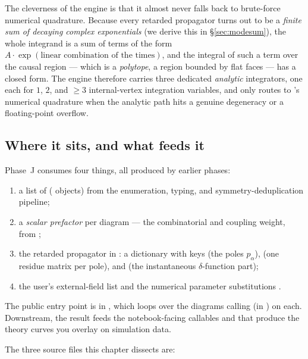 The cleverness of the engine is that it almost never falls back to brute-force
numerical quadrature. Because every retarded propagator turns out to be a
\emph{finite sum of decaying complex exponentials} (we derive this in
\S\ref{sec:modesum}), the whole integrand is a sum of terms of the form
$A \cdot \exp(\text{linear combination of the times})$, and the integral of such
a term over the causal region --- which is a \emph{polytope}, a region bounded by
flat faces --- has a closed form. The engine therefore carries three dedicated
\emph{analytic} integrators, one each for $1$, $2$, and $\ge 3$ internal-vertex
integration variables, and only routes to 's numerical quadrature
when the analytic path hits a genuine degeneracy or a floating-point overflow.

\subsection{Where it sits, and what feeds it}

Phase~J consumes four things, all produced by earlier phases:

\begin{enumerate}
  \item a list of  ( objects) from the
        enumeration, typing, and symmetry-deduplication pipeline;
  \item a \emph{scalar prefactor} per diagram --- the combinatorial and coupling
        weight, from ;
  \item the retarded propagator in : a dictionary
         with keys  (the poles $p_\alpha$),
         (one residue matrix per pole), and  (the
        instantaneous $\delta$-function part);
  \item the user's external-field list and the numerical parameter
        substitutions .
\end{enumerate}

\noindent The public entry point is  in
, which loops over the diagrams calling 
(in ) on each. Downstream, the result feeds the
notebook-facing callables  and  that produce
the theory curves you overlay on simulation data.

The three source files this chapter dissects are:

